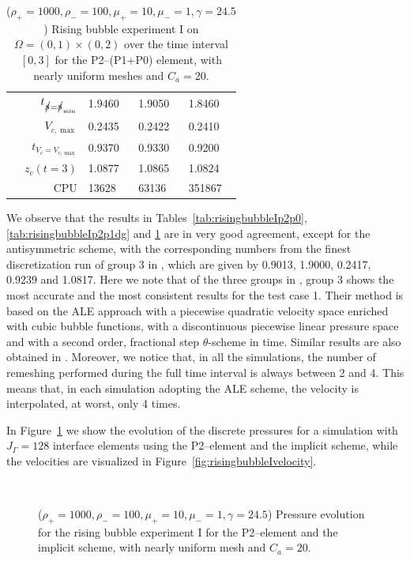 \begin{table}
\begin{tabular}{rlll}
$t_{\strikes = \strikes_{\min}}$ & 1.9460 & 1.9050 & 1.8460 \\
$V_{c,\max}$                     & 0.2435 & 0.2422 & 0.2410 \\
$t_{V_c = V_{c,\max}}$           & 0.9370 & 0.9330 & 0.9200 \\
$z_c(t=3)$                       & 1.0877 & 1.0865 & 1.0824 \\
CPU                              &  13628 &  63136 & 351867 \\
\hline
\end{tabular}
\hspace*{-3.25cm}
\caption[Navier--Stokes rising bubble I benchmark values P2--(P1+P0)]
{($\rho_+ = 1000,\rho_- = 100,\mu_+ = 10,\mu_- =1,\gamma = 24.5$)
Rising bubble experiment I on ${\Omega = (0,1) \times (0,2)}$ over the time
interval $[0,3]$ for the P2--(P1+P0) element, with nearly uniform meshes and
$C_a=20$\textdegree.}
\label{tab:risingbubbleIp2p1p0}
\end{table}
We observe that the results in Tables~\ref{tab:risingbubbleIp2p0},
\ref{tab:risingbubbleIp2p1dg} and \ref{tab:risingbubbleIp2p1p0} are in very
good agreement, except for the antisymmetric scheme, with the corresponding
numbers from the finest discretization run of group 3 in \cite{HysingTKPBGT09},
which are given by 0.9013, 1.9000, 0.2417, 0.9239 and 1.0817. Here we note that
of the three groups in \cite{HysingTKPBGT09}, group 3 shows the most accurate
and the most consistent results for the test case 1. Their method is based on
the ALE approach with a piecewise quadratic velocity space enriched with cubic
bubble functions, with a discontinuous piecewise linear pressure space and with
a second order, fractional step $\theta$-scheme in time. Similar results are
also obtained in \cite{fluidfbp}. Moreover, we notice that, in all the
simulations, the number of remeshing performed during the full time interval is
always between 2 and 4. This means that, in each simulation adopting the ALE
scheme, the velocity is interpolated, at worst, only 4 times.

In Figure~\ref{fig:risingbubbleIpressure} we show the evolution of the discrete
pressures for a simulation with $J_\Gamma=128$ interface elements using the
P2--\pdg element and the implicit scheme, while the velocities are visualized
in Figure~\ref{fig:risingbubbleIvelocity}.
\begin{figure}[htbp]
\centering
{}
\\
\caption[Navier--Stokes rising bubble I pressure]
{($\rho_+ = 1000,\rho_- = 100,\mu_+ = 10,\mu_- =1,\gamma = 24.5$)
Pressure evolution for the rising bubble experiment I for the P2--\pdg element
and the implicit scheme, with nearly uniform mesh and $C_a=20$\textdegree.}
\label{fig:risingbubbleIpressure}
\end{figure}

